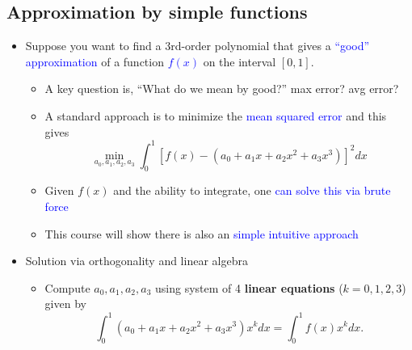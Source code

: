 \documentclass[11pt,twoside]{report}
\begin{document}
\subsection{Approximation by simple functions} 
\begin{itemize}

  \item  Suppose you want to find a 3rd-order polynomial that gives a \textcolor{blue}{``good'' approximation} of a function \textcolor{blue}{$f(x)$} on the interval $[0,1]$.
  
  
  \begin{itemize}
  
  \item A key question is, ``What do we mean by good?'' max error? avg error?
  
  \item A standard approach is to minimize the \textcolor{blue}{mean squared error} and this gives
  \[ \min_{a_0,a_1,a_2,a_3} \int_0^1 \left[ f(x) - (a_0+a_1 x+ a_2 x^2+a_3 x^3) \right]^2 dx \]
  
  \item  Given $f(x)$ and the ability to integrate, one \textcolor{blue}{can solve this via brute force}
  
  \item  This course will show there is also an \textcolor{blue}{simple intuitive approach}


\end{itemize}

\item  Solution via orthogonality and linear algebra 

\begin{itemize}

  \item  Compute $a_0,a_1,a_2,a_3$ using system of 4 \textbf{linear equations}  ($k=0,1,2,3$) given by
  \[ \int_0^1 (a_0+a_1 x+ a_2 x^2+a_3 x^3) x^k dx = \int_0^1 f(x)x^k dx. \]


\end{itemize}
\end{itemize}
\end{document}
